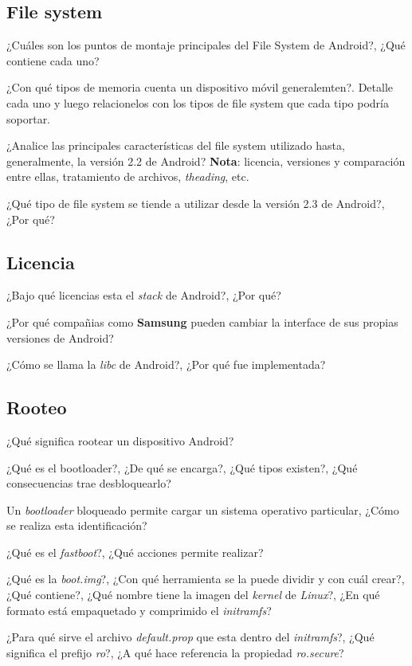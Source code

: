 \subsection{File system}
\begin{questions}
  \question ¿Cuáles son los puntos de montaje principales del File System de Android?, ¿Qué contiene cada uno?

  \question ¿Con qué tipos de memoria cuenta un dispositivo móvil generalemten?. Detalle cada uno y luego relacionelos con los tipos de file system que cada tipo podría soportar.
  
  \question ¿Analice las principales características del file system utilizado hasta, generalmente, la versión 2.2 de Android? \textbf{Nota}: licencia, versiones y comparación entre ellas, tratamiento de archivos, \textit{theading}, etc.
  
  \question ¿Qué tipo de file system se tiende a utilizar desde la versión 2.3 de Android?, ¿Por qué?
\end{questions}

\subsection{Licencia}
\begin{questions}
  \question ¿Bajo qué licencias esta el \textit{stack} de Android?, ¿Por qué?

  \question ¿Por qué compañias como \textbf{Samsung} pueden cambiar la interface de sus propias versiones de Android?
  
  \question ¿Cómo se llama la \textit{libc} de Android?, ¿Por qué fue implementada?
\end{questions}

\subsection{Rooteo}
\begin{questions}
  \question ¿Qué significa rootear un dispositivo Android?

  \question ¿Qué es el bootloader?, ¿De qué se encarga?, ¿Qué tipos existen?, ¿Qué consecuencias trae desbloquearlo?
  
  \question Un \textit{bootloader} bloqueado permite cargar un sistema operativo particular, ¿Cómo se realiza esta identificación?
  
  \question ¿Qué es el \textit{fastboot}?, ¿Qué acciones permite realizar?
  
  \question ¿Qué es la \textit{boot.img}?, ¿Con qué herramienta se la puede dividir y con cuál crear?, ¿Qué contiene?, ¿Qué nombre tiene la imagen del \textit{kernel} de \textit{Linux}?, ¿En qué formato está empaquetado y comprimido el \textit{initramfs}?
  
  \question ¿Para qué sirve el archivo \textit{default.prop} que esta dentro del \textit{initramfs}?, ¿Qué significa el prefijo \textit{ro}?, ¿A qué hace referencia la propiedad \textit{ro.secure}?
\end{questions}
